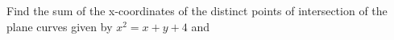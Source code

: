 Find the sum of the x-coordinates of the distinct points of intersection of the plane curves given by $x^2 = x + y + 4$ and 